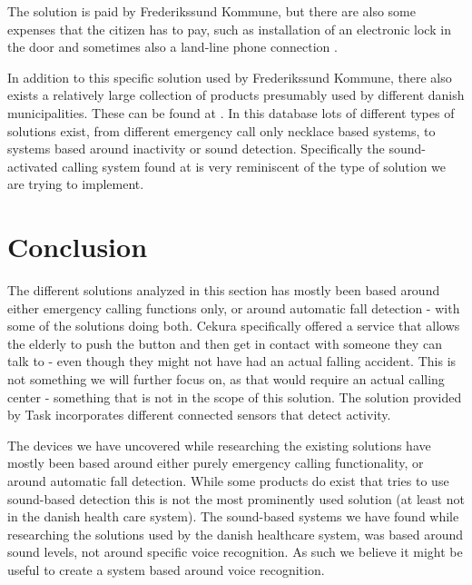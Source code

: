 The solution is paid by Frederikssund Kommune, but there are also some expenses that the citizen has to pay, such as installation of an electronic lock in the door and sometimes also a land-line phone connection \cite{frederikssund:arbejdesbeskrivelse} \cite{frederikssund:kvalitetsstandard}.

In addition to this specific solution used by Frederikssund Kommune, there also exists a relatively large collection of products presumably used by different danish municipalities.
These can be found at \cite{hmi}. In this database lots of different types of solutions exist, from different emergency call only necklace based systems, to systems based around inactivity or sound detection. Specifically the sound-activated calling system found at \cite{hmilak} is very reminiscent of the type of solution we are trying to implement.

\section{Conclusion}
The different solutions analyzed in this section has mostly been based around either emergency calling functions only, or around automatic fall detection - with some of the solutions doing both.
Cekura specifically offered a service that allows the elderly to push the button and then get in contact with someone they can talk to - even though they might not have had an actual falling accident. This is not something we will further focus on, as that would require an actual calling center - something that is not in the scope of this solution. 
The solution provided by Task incorporates different connected sensors that detect activity. 

The devices we have uncovered while researching the existing solutions have mostly been based around either purely emergency calling functionality, or around automatic fall detection.  While some products do exist that tries to use sound-based detection this is not the most prominently used solution (at least not in the danish health care system). The sound-based systems we have found while researching the solutions used by the danish healthcare system, was based around sound levels, not around specific voice recognition. As such we believe it might be useful to create a system based around voice recognition.

